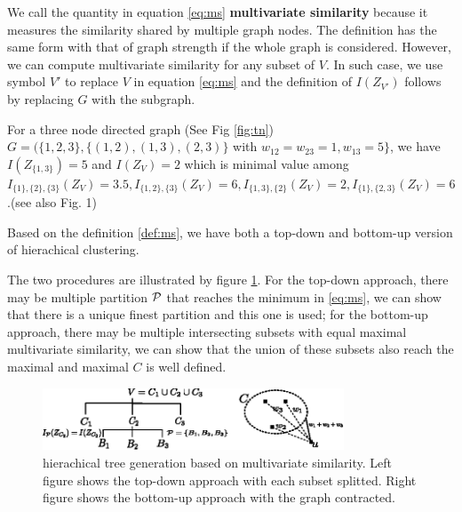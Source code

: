\documentclass{article}
\begin{document}
We call the quantity in equation \eqref{eq:ms} \textbf{multivariate similarity} because it measures the similarity shared by multiple graph nodes. The definition has the same form with that of graph strength if  the whole graph is considered\cite{RN12}. However, we can compute multivariate similarity for any subset of $V$. In such case, 
we use symbol $V'$ to replace $V$ in equation \eqref{eq:ms} and the definition of $I(Z_{V'})$ follows by replacing $G$ with the subgraph.
\begin{example}\label{eg:three}
For a three node directed graph (See Fig \ref{fig:tn}) $G=(\{1,2,3\},\{(1,2),(1,3),(2,3)\}$ with $w_{12}=w_{23}=1, w_{13}=5\}$, we have $I(Z_{\{1,3\}}) = 5$ and $I(Z_V) = 2$ which is minimal value among $I_{\{1\},\{2\},\{3\}}(Z_V)=3.5, I_{\{1, 2\},\{3\}}(Z_V)=6, I_{\{1,3\},\{2\}}(Z_V)=2, I_{\{1\},\{2,3\}}(Z_V)=6$.(see also \cite{RN9} Fig. 1)
\end{example}

Based on the definition \eqref{def:ms}, we have both a top-down and bottom-up version of hierachical clustering.


The two procedures are illustrated by figure \ref{fig:ta}. For the top-down approach, there may be multiple partition $\P$ that reaches the minimum in \eqref{eq:ms}, we can show that there is a unique finest partition and this one is used; for the bottom-up approach, there may be multiple intersecting subsets with equal maximal multivariate similarity, we can show that the union of these subsets also reach the maximal and maximal $C$ is well defined.
\begin{figure}
\centering
\includegraphics[width=0.8\textwidth]{pic/two_approach.eps}
\caption{hierachical tree generation based on multivariate similarity. Left figure shows the top-down approach with each subset splitted. Right figure shows the bottom-up approach with the graph contracted.}\label{fig:ta}
\end{figure}
\end{document}
